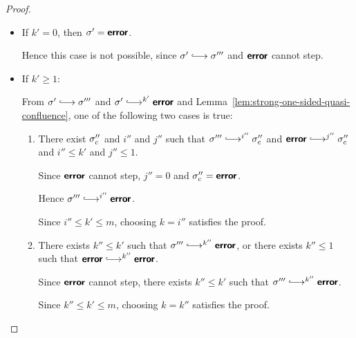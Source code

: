 \begin{proof}
\begin{enumerate}
\begin{itemize}
    \item If $k' = 0$, then $\sigma' = \textbf{\textsf{error}}$.

      Hence this case is not possible, since $\conf' \parstepsto
      \conf'''$ and $\textbf{\textsf{error}}$ cannot step.

    \item If $k' \geq 1$:

      From $\conf' \parstepsto \conf'''$ and $\conf' \parstepsto^{k'}
      \error$ and Lemma~\ref{lem:strong-one-sided-quasi-confluence},
      one of the following two cases is true:

      \begin{enumerate}
        \item There exist $\sigma''_c$ and $i''$ and $j''$ such that
          $\conf''' \parstepsto^{i''} \conf''_c$ and $\error
          \parstepsto^{j''} \conf''_c$ and $i'' \leq k'$ and $j'' \leq
          1$.

          Since $\textbf{\textsf{error}}$ cannot step, $j'' = 0$ and $\sigma''_c =
          \textbf{\textsf{error}}$.

          Hence $\conf''' \parstepsto^{i''} \error$.

          Since $i'' \leq k' \leq m$, choosing $k = i''$ satisfies the
          proof.

        \item There exists $k'' \leq k'$ such that $\conf'''
          \parstepsto^{k''} \error$, or there exists $k'' \leq 1$ such
          that $\error \parstepsto^{k''} \error$.

          Since $\textbf{\textsf{error}}$ cannot step, there exists $k'' \leq k'$ such
          that $\conf''' \parstepsto^{k''} \error$.

          Since $k'' \leq k' \leq m$, choosing $k = k''$ satisfies the
          proof.
      \end{enumerate}
    \end{itemize}
  \end{enumerate}

\end{proof}
